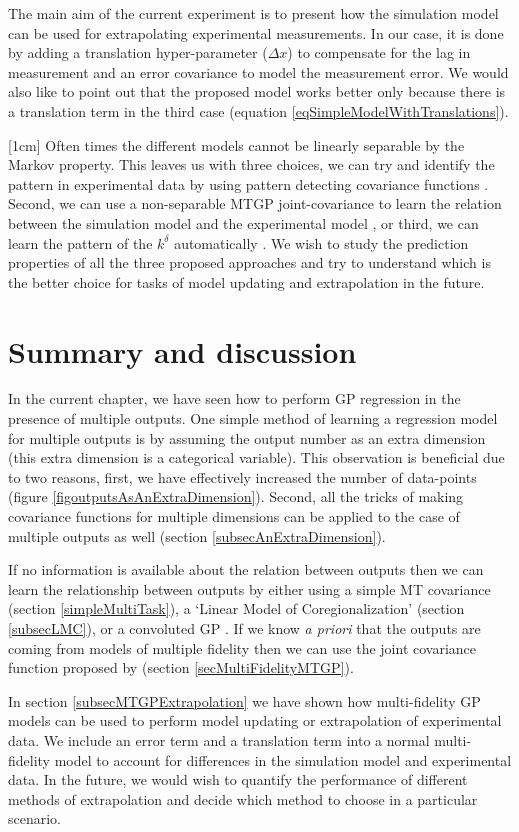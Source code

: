 The main aim of the current experiment is to present how the simulation model can be used for extrapolating experimental measurements. In our case, it is done by adding a translation hyper-parameter ($\Delta x$) to compensate for the lag in measurement and an error covariance to model the measurement error. We would also like to point out that the proposed model works better only because there is a translation term in the third case (equation \ref{eqSimpleModelWithTranslations}). 

[1cm]
Often times the different models cannot be linearly separable by the Markov property. This leaves us with three choices, we can try and identify the pattern in experimental data by using pattern detecting covariance functions \cite{wilson2014thesis}. Second, we can use a non-separable MTGP joint-covariance to learn the relation between the simulation model and the experimental model \cite{alvarez2011kernels}, or third, we can learn the pattern of the $k^\delta$ automatically \cite{duvenaud2013structure}. We wish to study the prediction properties of all the three proposed approaches and try to understand which is the better choice for tasks of model updating and extrapolation in the future.


\section{Summary and discussion}
In the current chapter, we have seen how to perform GP regression in the presence of multiple outputs. One simple method of learning a regression model for multiple outputs is by assuming the output number as an extra dimension (this extra dimension is a categorical variable). This observation is beneficial due to two reasons, first, we have effectively increased the number of data-points (figure \ref{figoutputsAsAnExtraDimension}). Second, all the tricks of making covariance functions for multiple dimensions can be applied to the case of multiple outputs as well (section \ref{subsecAnExtraDimension}). 

If no information is available about the relation between outputs then we can learn the relationship between outputs by either using a simple MT covariance (section \ref{simpleMultiTask}), a `Linear Model of Coregionalization' (section \ref{subsecLMC}), or a convoluted GP \cite{alvarez2011kernels}. If we know \textit{a priori} that the outputs are coming from models of multiple fidelity then we can use the joint covariance function proposed by  \cite{kennedy2000predicting} (section \ref{secMultiFidelityMTGP}). 

In section \ref{subsecMTGPExtrapolation} we have shown how multi-fidelity GP models can be used to perform model updating or extrapolation of experimental data. We include an error term and a translation term into a normal multi-fidelity model to account for differences in the simulation model and experimental data. In the future, we would wish to quantify the performance of different methods of extrapolation and decide which method to choose in a particular scenario.
